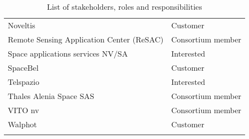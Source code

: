 \begin{longtable}{p{9cm}l}
	Noveltis&Customer\\
	Remote Sensing Application Center (ReSAC)                               & Consortium member \\
	Space applications services NV/SA&Interested\\
	SpaceBel&Customer\\
	Telspazio&Interested\\
	Thales Alenia Space SAS             & Consortium member                                                                       \\ 
	VITO nv                             & Consortium member \\
	Walphot&Customer\\

	\bottomrule[2pt]

	\caption{List of stakeholders, roles and responsibilities}
	\label{table_stakeholders}

\end{longtable}

